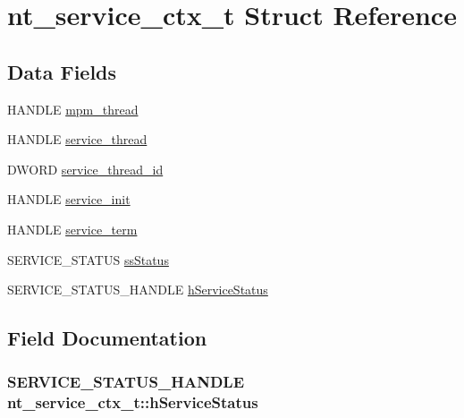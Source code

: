 \hypertarget{structnt__service__ctx__t}{}\section{nt\+\_\+service\+\_\+ctx\+\_\+t Struct Reference}
\label{structnt__service__ctx__t}
\subsection*{Data Fields}
\begin{DoxyCompactItemize}
\item 
H\+A\+N\+D\+LE \hyperlink{structnt__service__ctx__t_a24fc510bea637ddd066087c9aa3808a6}{mpm\+\_\+thread}
\item 
H\+A\+N\+D\+LE \hyperlink{structnt__service__ctx__t_a6a772902c7ac7c10c8bf600dda63cce3}{service\+\_\+thread}
\item 
D\+W\+O\+RD \hyperlink{structnt__service__ctx__t_ab481b3ab6af7abf3e39b760f618fbda0}{service\+\_\+thread\+\_\+id}
\item 
H\+A\+N\+D\+LE \hyperlink{structnt__service__ctx__t_a212e05e25426388b76bda40a0d2aa173}{service\+\_\+init}
\item 
H\+A\+N\+D\+LE \hyperlink{structnt__service__ctx__t_aa2078760184bdfe412863b8e852f9ba6}{service\+\_\+term}
\item 
S\+E\+R\+V\+I\+C\+E\+\_\+\+S\+T\+A\+T\+US \hyperlink{structnt__service__ctx__t_a073bebf7ee94c8770e34da99914bbe37}{ss\+Status}
\item 
S\+E\+R\+V\+I\+C\+E\+\_\+\+S\+T\+A\+T\+U\+S\+\_\+\+H\+A\+N\+D\+LE \hyperlink{structnt__service__ctx__t_a1ca5a3b45dbc44fc1707ca71c2b3e559}{h\+Service\+Status}
\end{DoxyCompactItemize}


\subsection{Field Documentation}
\subsubsection[{\texorpdfstring{h\+Service\+Status}{hServiceStatus}}]{\setlength{\rightskip}{0pt plus 5cm}S\+E\+R\+V\+I\+C\+E\+\_\+\+S\+T\+A\+T\+U\+S\+\_\+\+H\+A\+N\+D\+LE nt\+\_\+service\+\_\+ctx\+\_\+t\+::h\+Service\+Status}\hypertarget{structnt__service__ctx__t_a1ca5a3b45dbc44fc1707ca71c2b3e559}{}\label{structnt__service__ctx__t_a1ca5a3b45dbc44fc1707ca71c2b3e559}
